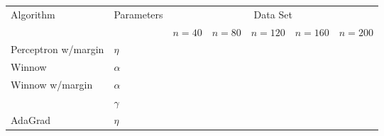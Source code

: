    \begin{table}[!hbp]
    \begin{tabular}{|p{4.7cm}<{\centering}|p{2.0cm}<{\centering}|p{1.5cm}<{\centering}|p{1.5cm}<{\centering}|p{1.5cm}<{\centering}|p{1.5cm}<{\centering}|p{1.5cm}<{\centering}|}
      \hline
      \multirow{2}{*}{Algorithm} & \multirow{2}{*}{Parameters} & \multicolumn{5}{|c|}{Data Set} \\
      \cline{3-7}
 & & $n=40$& $n=80$& $n=120$& $n=160$& $n=200$\\
 \hline
      Perceptron w/margin &          $\eta$          &                   &     & & &                              \\\hline

      Winnow               &     $\alpha$           &                     &         & & &                          \\\hline %
      \multirow{2}{*}{Winnow w/margin}     & $\alpha$&                                     &     & & &                \\
      \cline{2-7}
      & $\gamma$ &  & & & &\\ \hline %
      AdaGrad             & $\eta$&                                      &               & & &                    \\\hline %
    \end{tabular}
    \end{table}
    
